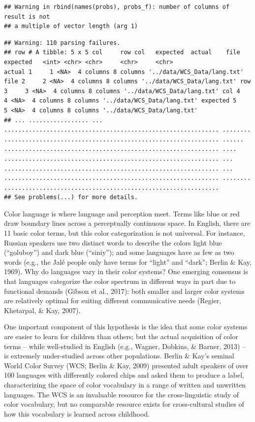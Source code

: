 \documentclass[man]{apa6}
\theoremstyle{definition}
\theoremstyle{definition}
\theoremstyle{definition}
\theoremstyle{remark}
\begin{document}
\begin{verbatim}
## Warning in rbind(names(probs), probs_f): number of columns of result is not
## a multiple of vector length (arg 1)
\end{verbatim}

\begin{verbatim}
## Warning: 110 parsing failures.
## row # A tibble: 5 x 5 col     row col   expected  actual    file                        expected   <int> <chr> <chr>     <chr>     <chr>                       actual 1     1 <NA>  4 columns 8 columns '../data/WCS_Data/lang.txt' file 2     2 <NA>  4 columns 8 columns '../data/WCS_Data/lang.txt' row 3     3 <NA>  4 columns 8 columns '../data/WCS_Data/lang.txt' col 4     4 <NA>  4 columns 8 columns '../data/WCS_Data/lang.txt' expected 5     5 <NA>  4 columns 8 columns '../data/WCS_Data/lang.txt'
## ... ................. ... ............................................................. ........ ............................................................. ...... ............................................................. .... ............................................................. ... ............................................................. ... ............................................................. ........ .............................................................
## See problems(...) for more details.
\end{verbatim}

Color language is where language and perception meet. Terms like blue or
red draw boundary lines across a perceptually continuous space. In
English, there are 11 basic color terms, but this color categorization
is not universal. For instance, Russian speakers use two distinct words
to describe the colors light blue (\enquote{goluboy}) and dark blue
(\enquote{siniy}); and some languages have as few as two words (e.g.,
the Jalé people only have terms for \enquote{light} and \enquote{dark};
Berlin \& Kay, 1969). Why do languages vary in their color systems? One
emerging consensus is that languages categorize the color spectrum in
different ways in part due to functional demands (Gibson et al., 2017):
both smaller and larger color systems are relatively optimal for suiting
different communicative needs (Regier, Khetarpal, \& Kay, 2007).

One important component of this hypothesis is the idea that some color
systems are easier to learn for children than others; but the actual
acquisition of color terms -- while well-studied in English (e.g.,
Wagner, Dobkins, \& Barner, 2013) -- is extremely under-studied across
other populations. Berlin \& Kay's seminal World Color Survey (WCS;
Berlin \& Kay, 2009) presented adult speakers of over 100 languages with
differently colored chips and asked them to produce a label,
characterizing the space of color vocabulary in a range of written and
unwritten languages. The WCS is an invaluable resource for the
cross-linguistic study of color vocabulary, but no comparable resource
exists for cross-cultural studies of how this vocabulary is learned
across childhood.
\end{document}
